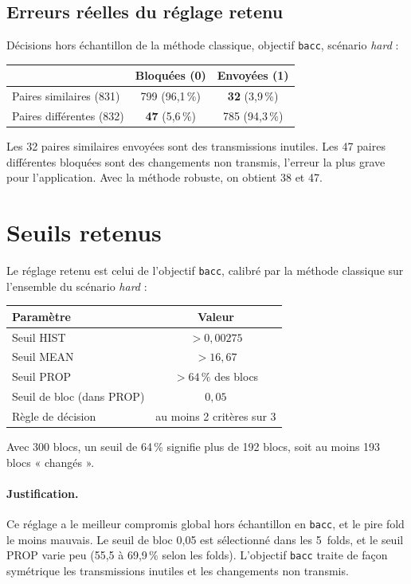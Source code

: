 \documentclass[11pt,a4paper]{article}
\begin{document}
	\subsection{Erreurs réelles du réglage retenu}
	Décisions hors échantillon de la méthode classique, objectif \texttt{bacc}, scénario \textit{hard} :
	\begin{center}
		\begin{tabular}{lcc}
			\toprule
			& Bloquées (0) & Envoyées (1) \\
			\midrule
			Paires similaires (831) & 799 (96,1\,\%) & \textbf{32} (3,9\,\%) \\
			Paires différentes (832) & \textbf{47} (5,6\,\%) & 785 (94,3\,\%) \\
			\bottomrule
		\end{tabular}
	\end{center}
	Les 32 paires similaires envoyées sont des transmissions inutiles. Les 47 paires différentes bloquées sont des
	changements non transmis, l'erreur la plus grave pour l'application. Avec la méthode robuste, on obtient 38 et 47.
	
	\section{Seuils retenus}
	Le réglage retenu est celui de l'objectif \texttt{bacc}, calibré par la méthode classique sur l'ensemble du scénario
	\textit{hard} :
	\begin{center}
		\begin{tabular}{lc}
			\toprule
			Paramètre & Valeur \\
			\midrule
			Seuil HIST & $> 0{,}00275$ \\
			Seuil MEAN & $> 16{,}67$ \\
			Seuil PROP & $> 64\,\%$ des blocs \\
			Seuil de bloc (dans PROP) & $0{,}05$ \\
			Règle de décision & au moins 2 critères sur 3 \\
			\bottomrule
		\end{tabular}
	\end{center}
	Avec 300 blocs, un seuil de 64\,\% signifie plus de 192 blocs, soit au moins 193 blocs « changés ».
	
	\paragraph{Justification.} Ce réglage a le meilleur compromis global hors échantillon en \texttt{bacc}, et le pire fold le
	moins mauvais. Le seuil de bloc 0,05 est sélectionné dans les 5~folds, et le seuil PROP varie peu (55,5 à 69,9\,\%
	selon les folds). L'objectif \texttt{bacc} traite de façon symétrique les transmissions inutiles et les changements
	non transmis.
	
\end{document}
